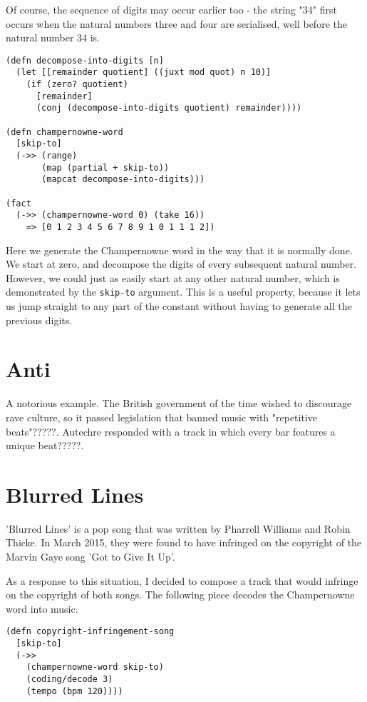 \documentclass[numbers]{sigplanconf}
\begin{document}
Of course, the sequence of digits may occur earlier too - the string "34" first occurs when the natural numbers three and
four are serialised, well before the natural number 34 is.

\begin{verbatim}
(defn decompose-into-digits [n]
  (let [[remainder quotient] ((juxt mod quot) n 10)]
    (if (zero? quotient)
      [remainder]
      (conj (decompose-into-digits quotient) remainder))))

(defn champernowne-word
  [skip-to]
  (->> (range)
       (map (partial + skip-to))
       (mapcat decompose-into-digits)))

(fact
  (->> (champernowne-word 0) (take 16))
    => [0 1 2 3 4 5 6 7 8 9 1 0 1 1 1 2])
\end{verbatim}

Here we generate the Champernowne word in the way that it is normally done. We start at zero, and decompose the digits of
every subsequent natural number. However, we could just as easily start at any other natural number, which is demonstrated
by the \verb|skip-to| argument. This is a useful property, because it lets us jump straight to any part of the constant
without having to generate all the previous digits.

\section{Anti}

A notorious example. The British government of the time wished to discourage rave culture, so it passed legislation that banned
music with "repetitive beats"?????. Autechre responded with a track in which every bar features a unique beat?????.

\section{Blurred Lines}

'Blurred Lines' is a pop song that was written by Pharrell Williams and Robin Thicke. In March 2015,
they were found to have infringed on the copyright of the Marvin Gaye song 'Got to Give It Up'.

As a response to this situation, I decided to compose a track that would infringe on the copyright of both songs. The following
piece decodes the Champernowne word into music.

\begin{verbatim}
(defn copyright-infringement-song
  [skip-to]
  (->>
    (champernowne-word skip-to)
    (coding/decode 3)
    (tempo (bpm 120))))
\end{verbatim}
\end{document}

